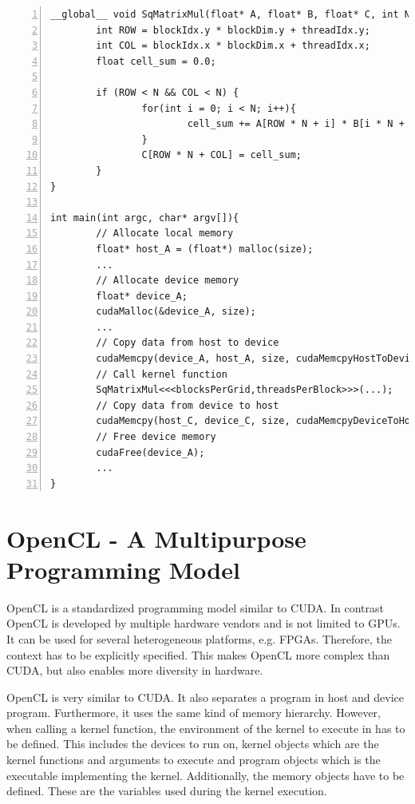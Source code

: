 \documentclass[a4paper,12pt]{llncs}
\numberwithin{equation}{section}
\begin{document}
\begin{lstlisting}[style=cpp,caption={Kernel Function of Matrix Multiplication},label={lst:CUDA_EX},numbers=left]
__global__ void SqMatrixMul(float* A, float* B, float* C, int N) {
        int ROW = blockIdx.y * blockDim.y + threadIdx.y;
        int COL = blockIdx.x * blockDim.x + threadIdx.x;
        float cell_sum = 0.0;

        if (ROW < N && COL < N) {
                for(int i = 0; i < N; i++){
                        cell_sum += A[ROW * N + i] * B[i * N + COL];
                }
                C[ROW * N + COL] = cell_sum;
        }
}

int main(int argc, char* argv[]){
        // Allocate local memory
        float* host_A = (float*) malloc(size);
        ...
        // Allocate device memory
        float* device_A;
        cudaMalloc(&device_A, size);
        ...
        // Copy data from host to device
        cudaMemcpy(device_A, host_A, size, cudaMemcpyHostToDevice);
        // Call kernel function
        SqMatrixMul<<<blocksPerGrid,threadsPerBlock>>>(...);      
        // Copy data from device to host
        cudaMemcpy(host_C, device_C, size, cudaMemcpyDeviceToHost);
        // Free device memory
        cudaFree(device_A);
        ...
}
\end{lstlisting}



 
\section{OpenCL - A Multipurpose Programming Model}
  OpenCL is a standardized programming model similar to CUDA.
  In contrast OpenCL is developed by multiple hardware vendors and is not limited to GPUs.
  It can be used for several heterogeneous platforms, e.g. FPGAs.
  Therefore, the context has to be explicitly specified.
  This makes OpenCL more complex than CUDA, but also enables more diversity in hardware.~\cite{Rauber.2012}

  OpenCL is very similar to CUDA.
  It also separates a program in host and device program.
  Furthermore, it uses the same kind of memory hierarchy.
  However, when calling a kernel function, the environment of the kernel to execute in has to be defined.
  This includes the devices to run on, kernel objects which are the kernel functions and arguments to execute and program objects which is the executable implementing the kernel.
  Additionally, the memory objects have to be defined.
  These are the variables used during the kernel execution.~\cite{Khronos.2019}
  
\end{document}

